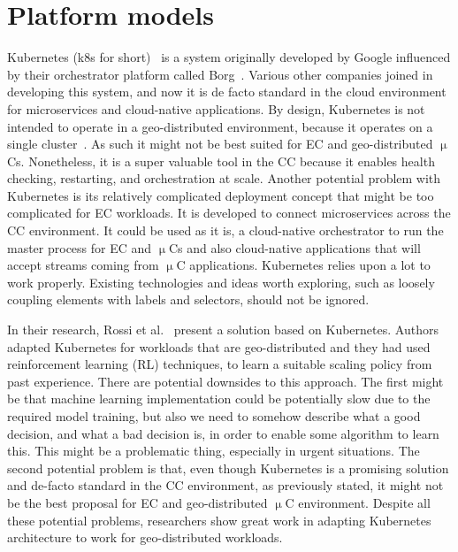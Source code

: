 \section{Platform models}\label{sec:platform_models}
%
Kubernetes (k8s for short)~\cite{BurnsGOBW16} is a system originally developed by Google influenced by their orchestrator platform called Borg~\cite{VermaPKOTW15}. Various other companies joined in developing this system, and now it is de facto standard in the cloud environment for microservices and cloud-native applications. By design, Kubernetes is not intended to operate in a geo-distributed environment, because it operates on a single cluster~\cite{BurnsGOBW16, VermaPKOTW15, RossiCPN20}. As such it might not be best suited for EC and geo-distributed $\upmu$Cs. Nonetheless, it is a super valuable tool in the CC because it enables health checking, restarting, and orchestration at scale. Another potential problem with Kubernetes is its relatively complicated deployment concept that might be too complicated for EC workloads. It is developed to connect microservices across the CC environment. It could be used as it is, a cloud-native orchestrator to run the master process for EC and $\upmu$Cs and also cloud-native applications that will accept streams coming from $\upmu$C applications. Kubernetes relies upon a lot to work properly. Existing technologies and ideas worth exploring, such as loosely coupling elements with labels and selectors, should not be ignored.

In their research, Rossi et al.~\cite{RossiCPN20} present a solution based on Kubernetes. Authors adapted Kubernetes for workloads that are geo-distributed and they had used reinforcement learning (RL) techniques, to learn a suitable scaling policy from past experience. There are potential downsides to this approach. The first might be that machine learning implementation could be potentially slow due to the required model training, but also we need to somehow describe what a good decision, and what a bad decision is, in order to enable some algorithm to learn this. This might be a problematic thing, especially in urgent situations. The second potential problem is that, even though Kubernetes is a promising solution and de-facto standard in the CC environment, as previously stated, it might not be the best proposal for EC and geo-distributed $\upmu$C environment. Despite all these potential problems, researchers show great work in adapting Kubernetes architecture to work for geo-distributed workloads.

